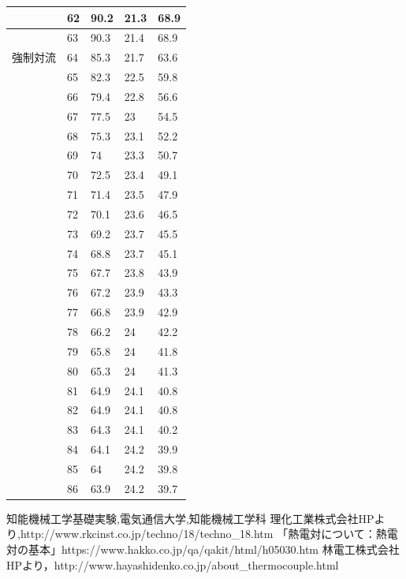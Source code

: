 \documentclass[a4paper,11pt,uplatex]{jsarticle}
\begin{document}
\begin{longtable}{lllll}
 & 62 & 90.2 & 21.3 & 68.9 \\ \hline
 & 63 & 90.3 & 21.4 & 68.9 \\ \hline
強制対流 & 64 & 85.3 & 21.7 & 63.6 \\ \hline
 & 65 & 82.3 & 22.5 & 59.8 \\ \hline
 & 66 & 79.4 & 22.8 & 56.6 \\ \hline
 & 67 & 77.5 & 23 & 54.5 \\ \hline
 & 68 & 75.3 & 23.1 & 52.2 \\ \hline
 & 69 & 74 & 23.3 & 50.7 \\ \hline
 & 70 & 72.5 & 23.4 & 49.1 \\ \hline
 & 71 & 71.4 & 23.5 & 47.9 \\ \hline
 & 72 & 70.1 & 23.6 & 46.5 \\ \hline
 & 73 & 69.2 & 23.7 & 45.5 \\ \hline
 & 74 & 68.8 & 23.7 & 45.1 \\ \hline
 & 75 & 67.7 & 23.8 & 43.9 \\ \hline
 & 76 & 67.2 & 23.9 & 43.3 \\ \hline
 & 77 & 66.8 & 23.9 & 42.9 \\ \hline
 & 78 & 66.2 & 24 & 42.2 \\ \hline
 & 79 & 65.8 & 24 & 41.8 \\ \hline
 & 80 & 65.3 & 24 & 41.3 \\ \hline
 & 81 & 64.9 & 24.1 & 40.8 \\ \hline
 & 82 & 64.9 & 24.1 & 40.8 \\ \hline
 & 83 & 64.3 & 24.1 & 40.2 \\ \hline
 & 84 & 64.1 & 24.2 & 39.9 \\ \hline
 & 85 & 64 & 24.2 & 39.8 \\ \hline
 & 86 & 63.9 & 24.2 & 39.7
\end{longtable}


\begin{thebibliography}{9}
  知能機械工学基礎実験,電気通信大学,知能機械工学科
  理化工業株式会社HPより,http://www.rkcinst.co.jp/techno/18/techno\_18.htm
  「熱電対について：熱電対の基本」https://www.hakko.co.jp/qa/qakit/html/h05030.htm
  林電工株式会社HPより，http://www.hayashidenko.co.jp/about\_thermocouple.html
\end{thebibliography}
\end{document}
